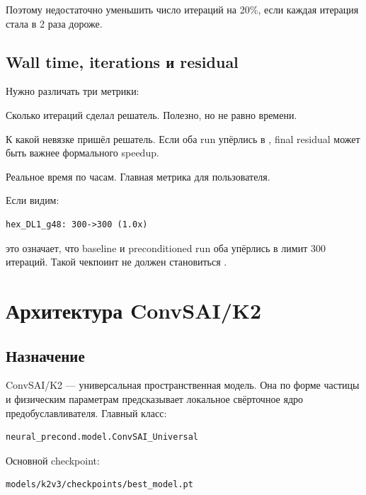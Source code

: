\documentclass[11pt,a4paper,oneside]{book}
\newcommand{\code}[1]{\texttt{\detokenize{#1}}}
\begin{document}
Поэтому недостаточно уменьшить число итераций на 20\%, если каждая итерация
стала в 2 раза дороже.

\section{Wall time, iterations и residual}

Нужно различать три метрики:

\begin{description}[leftmargin=3.5cm,style=nextline]
  \item[Iterations]
  Сколько итераций сделал решатель. Полезно, но не равно времени.

  \item[Final residual]
  К какой невязке пришёл решатель. Если оба run упёрлись в \code{maxiter},
  final residual может быть важнее формального speedup.

  \item[Wall time]
  Реальное время по часам. Главная метрика для пользователя.
\end{description}

Если видим:

\begin{lstlisting}
hex_DL1_g48: 300->300 (1.0x)
\end{lstlisting}

это означает, что baseline и preconditioned run оба упёрлись в лимит 300
итераций. Такой чекпоинт не должен становиться \code{best_model.pt}.

\chapter{Архитектура ConvSAI/K2}

\section{Назначение}

ConvSAI/K2 --- универсальная пространственная модель. Она по форме частицы и
физическим параметрам предсказывает локальное свёрточное ядро
предобуславливателя. Главный класс:

\begin{lstlisting}
neural_precond.model.ConvSAI_Universal
\end{lstlisting}

Основной checkpoint:

\begin{lstlisting}
models/k2v3/checkpoints/best_model.pt
\end{lstlisting}
\end{document}
